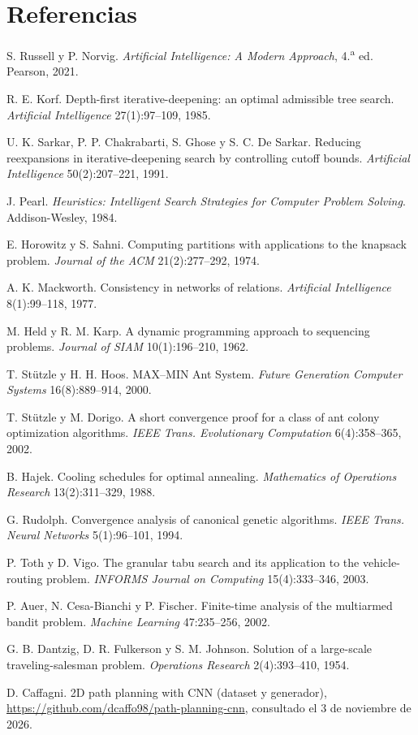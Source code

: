 \documentclass[11pt]{article}
\theoremstyle{remark}
\begin{document}
\section*{Referencias}
\begin{enumerate}[label={[\arabic*]},leftmargin=*]
\item S. Russell y P. Norvig. \emph{Artificial Intelligence: A Modern Approach}, 4.\textsuperscript{a}
ed. Pearson, 2021.
\item R. E. Korf. Depth-first iterative-deepening: an optimal admissible tree search.
\emph{Artificial Intelligence} 27(1):97--109, 1985.
\item U. K. Sarkar, P. P. Chakrabarti, S. Ghose y S. C. De Sarkar. Reducing reexpansions in
iterative-deepening search by controlling cutoff bounds. \emph{Artificial Intelligence}
50(2):207--221, 1991.
\item J. Pearl. \emph{Heuristics: Intelligent Search Strategies for Computer Problem Solving}.
Addison-Wesley, 1984.
\item E. Horowitz y S. Sahni. Computing partitions with applications to the knapsack problem.
\emph{Journal of the ACM} 21(2):277--292, 1974.
\item A. K. Mackworth. Consistency in networks of relations. \emph{Artificial Intelligence}
8(1):99--118, 1977.
\item M. Held y R. M. Karp. A dynamic programming approach to sequencing problems. \emph{Journal of
SIAM} 10(1):196--210, 1962.
\item T. Stützle y H. H. Hoos. MAX--MIN Ant System. \emph{Future Generation Computer Systems}
16(8):889--914, 2000.
\item T. Stützle y M. Dorigo. A short convergence proof for a class of ant colony optimization
algorithms. \emph{IEEE Trans. Evolutionary Computation} 6(4):358--365, 2002.
\item B. Hajek. Cooling schedules for optimal annealing. \emph{Mathematics of Operations Research}
13(2):311--329, 1988.
\item G. Rudolph. Convergence analysis of canonical genetic algorithms. \emph{IEEE Trans. Neural
Networks} 5(1):96--101, 1994.
\item P. Toth y D. Vigo. The granular tabu search and its application to the vehicle-routing
problem. \emph{INFORMS Journal on Computing} 15(4):333--346, 2003.
\item P. Auer, N. Cesa-Bianchi y P. Fischer. Finite-time analysis of the multiarmed bandit problem.
\emph{Machine Learning} 47:235--256, 2002.
\item G. B. Dantzig, D. R. Fulkerson y S. M. Johnson. Solution of a large-scale traveling-salesman
problem. \emph{Operations Research} 2(4):393--410, 1954.
\item D. Caffagni. 2D path planning with CNN (dataset y generador),
\url{https://github.com/dcaffo98/path-planning-cnn}, consultado el 3 de noviembre de 2026.
\end{enumerate}
\end{document}
